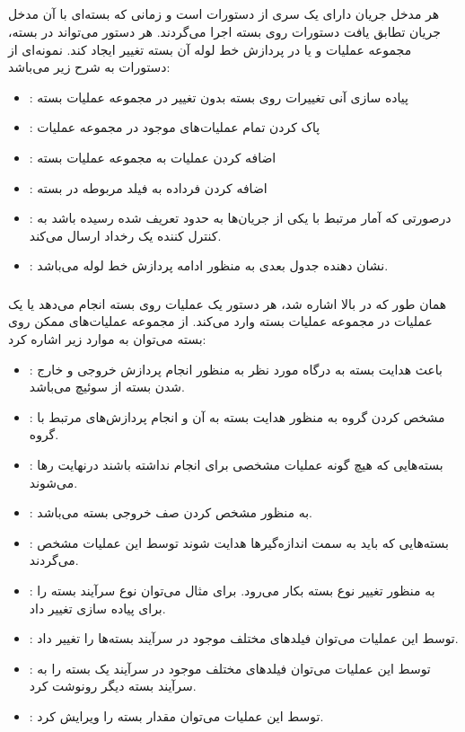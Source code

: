 \subsection{}
هر مدخل جریان دارای یک سری از دستورات است و زمانی که بسته‌ای با آن مدخل جریان تطابق یافت دستورات روی بسته اجرا می‌گردند. هر دستور می‌تواند در بسته، مجموعه عملیات و یا در پردازش خط لوله آن بسته تغییر ایجاد کند. نمونه‌ای از دستورات به شرح زیر می‌باشد:
\begin{itemize}
	\item {}:
پیاده سازی آنی تغییرات روی بسته بدون تغییر در مجموعه عملیات بسته
	\item {}:
پاک کردن تمام عملیات‌های موجود در مجموعه عملیات
	\item {}:
اضافه کردن عملیات به مجموعه عملیات بسته
	\item {}:
اضافه کردن فرداده به فیلد مربوطه در بسته
	\item {}:
درصورتی که آمار مرتبط با یکی از جریان‌ها به حدود تعریف شده رسیده باشد به کنترل کننده یک رخداد ارسال می‌کند.
	\item {}:
نشان دهنده جدول بعدی به منظور ادامه پردازش خط لوله می‌باشد.
\end{itemize}
\subsubsection{}
همان طور که در بالا اشاره شد، هر دستور یک عملیات روی بسته انجام می‌دهد یا یک عملیات در مجموعه عملیات بسته وارد می‌کند. از مجموعه عملیات‌های ممکن روی بسته می‌توان به موارد زیر اشاره کرد:
\begin{itemize}
	\item {}:
باعث هدایت بسته به درگاه مورد نظر به منظور انجام پردازش خروجی و خارج شدن بسته از سوئیچ می‌باشد.
	\item {}:
مشخص کردن گروه به منظور هدایت بسته به آن و انجام پردازش‌های مرتبط با گروه.
	\item {}:
بسته‌هایی که هیچ گونه عملیات مشخصی برای انجام نداشته باشند درنهایت رها می‌شوند.
	\item {}:
به منظور مشخص کردن صف خروجی بسته می‌باشد.
	\item {}:
بسته‌هایی که باید به سمت اندازه‌گیر‌ها هدایت شوند توسط این عملیات مشخص می‌گردند.
	\item {}:
به منظور تغییر نوع بسته بکار می‌رود. برای مثال می‌توان نوع سرآیند بسته را برای پیاده سازی  تغییر داد.
	\item {}:
توسط این عملیات می‌توان فیلد‌های مختلف موجود در سرآیند بسته‌ها را تغییر داد.
	\item {}:
توسط این عملیات می‌توان فیلد‌های مختلف موجود در سرآیند یک بسته را به سرآیند بسته دیگر رونوشت کرد.
	\item {}:
توسط این عملیات می‌توان مقدار  بسته را ویرایش کرد.
\end{itemize}

